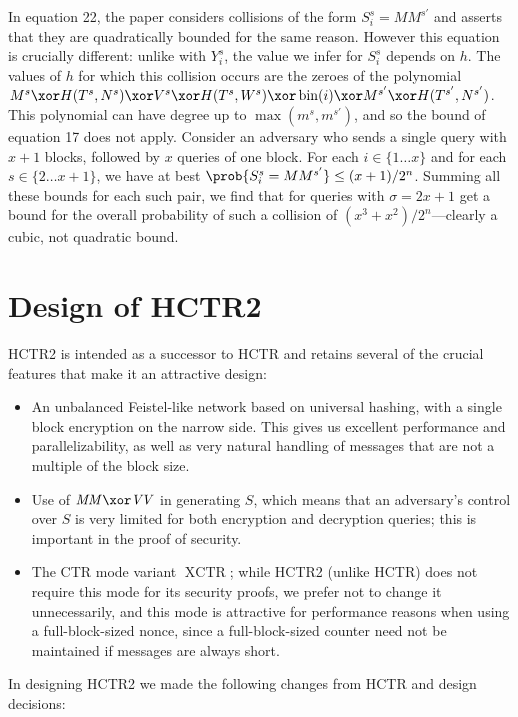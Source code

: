 \documentclass[letterpaper,11pt]{article}
\newcommand*{\MM}{\mathit{MM}}
\newcommand*{\VV}{\mathit{VV}}
\DeclareMathOperator{\fromint}{bin}
\DeclareMathOperator{\XCTR}{XCTR}
\begin{document}
In equation 22, the paper considers collisions of the form 
\(S_i^s = MM^{s'}\) and asserts that they are
quadratically bounded for the same reason. However this equation
is crucially different: unlike with \(Y_i^s\), the value we
infer for \(S_i^s\) depends on \(h\). The values of \(h\)
for which this collision occurs are
the zeroes of the polynomial
\(M^s \xor H(T^s, N^s)
\xor V^s \xor H(T^s, W^s) \xor \fromint(i) 
\xor M^{s'} \xor H(T^{s'}, N^{s'})\).
This polynomial can have degree up to 
\(\max(m^s, m^{s'})\), and so the bound of
equation 17 does not apply.
Consider an adversary who
sends a single query with \(x+1\) blocks, followed by
\(x\) queries of one block. For each \(i \in \{1\ldots x\}\) and
for each \(s \in \{2 \ldots x + 1\}\), we have at best
\(\prob{S_i^s = MM^{s'}} \leq (x + 1)/2^n\). Summing
all these bounds for each such pair, we find that
for queries with \(\sigma = 2x + 1\)
get a bound for the overall probability of such a collision of 
\((x^3 + x^2)/2^n\)---clearly a cubic, not quadratic bound.

\section{Design of HCTR2}
HCTR2 is intended as a successor to HCTR and retains several of the
crucial features that make it an attractive design:
\begin{itemize}
    \item An unbalanced Feistel-like network based on universal
    hashing, with a single block encryption on the narrow side.
    This gives us excellent performance and parallelizability,
    as well as very natural handling of messages that are not
    a multiple of the block size.
    \item Use of \(\MM \xor \VV\) in generating \(S\), which means
    that an adversary's control over \(S\) is very limited for both
    encryption and decryption queries; this is important in the
    proof of security.
    \item The CTR mode variant \(\XCTR\); while HCTR2 (unlike HCTR)
    does not require this mode for its security proofs, 
    we prefer not to change it unnecessarily, and this mode is
    attractive for performance reasons when using a full-block-sized
    nonce, since a full-block-sized counter need not be maintained
    if messages are always short.
\end{itemize}

In designing HCTR2 we made the following changes from HCTR and design decisions:
\end{document}
